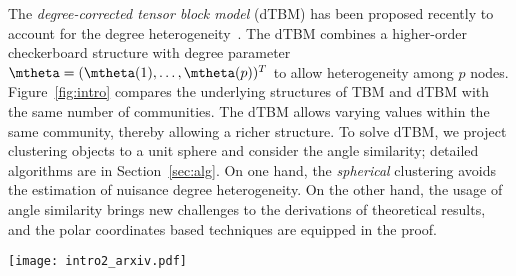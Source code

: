 \documentclass[lettersize,onecolumn,journal]{IEEEtran}
\theoremstyle{definition}
\theoremstyle{definition}
\def\fixme#1#2{\textbf{\color{red}[FIXME (#1): #2]}}
\begin{document}
The \emph{degree-corrected tensor block model} (dTBM) has been proposed recently to account for the degree heterogeneity~\citep{ke2019community}. The dTBM combines a higher-order checkerboard structure with degree parameter $\mtheta=(\mtheta(1),\ldots,\mtheta(p))^T$ to allow heterogeneity among $p$ nodes.  Figure~\ref{fig:intro} compares the underlying structures of TBM and dTBM with the same number of communities. The dTBM allows varying values within the same community, thereby allowing a richer structure. {\color{blue} To solve dTBM, we project clustering objects to a unit sphere and consider the angle similarity; detailed algorithms are in Section~\ref{sec:alg}. On one hand, the \textit{spherical} clustering avoids the estimation of nuisance degree heterogeneity. On the other hand, the usage of angle similarity brings new challenges to the derivations of theoretical results, and the polar coordinates based techniques are equipped in the proof.
}


\begin{figure*}[t]
    \centering
    \texttt{[image: intro2\_arxiv.pdf]}
    \caption{Examples for order-3 tensor block model (TBM) with and without degree correction. Both TBM and dTBM have four communities on each mode, while dTBM allows a richer structure with degree heterogeneity.
    }
    \label{fig:intro}
\end{figure*}
\end{document}
